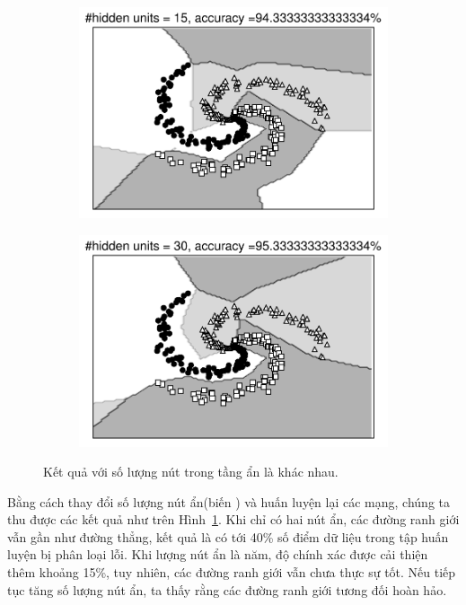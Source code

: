 \begin{figure}[t]
\begin{subfigure}{0.45\textwidth}
\includegraphics[width=0.99\linewidth]{ebookML_src/src/mlp/ex_res15.pdf}
\caption{}
\end{subfigure}
\begin{subfigure}{0.45\textwidth}
\includegraphics[width=0.99\linewidth]{ebookML_src/src/mlp/ex_res30.pdf}
\caption{}
\end{subfigure}
\caption{
Kết quả với số lượng nút trong tầng ẩn là khác nhau.
}
\label{fig:14_10}
\end{figure}

Bằng cách thay đổi số lượng nút ẩn(biến ) và huấn luyện lại các
mạng, chúng ta thu được các kết quả như trên Hình~\ref{fig:14_10}. Khi chỉ có
hai nút ẩn, các đường ranh giới vẫn gần như đường thẳng, kết quả là có tới 40\%
số điểm dữ liệu trong tập huấn luyện bị phân loại lỗi. Khi lượng nút ẩn là năm,
độ chính xác được cải thiện thêm khoảng 15\%, tuy nhiên, các đường ranh giới vẫn
chưa thực sự tốt. Nếu tiếp tục tăng số lượng nút ẩn, ta thấy rằng các đường ranh
giới tương đối hoàn hảo.

